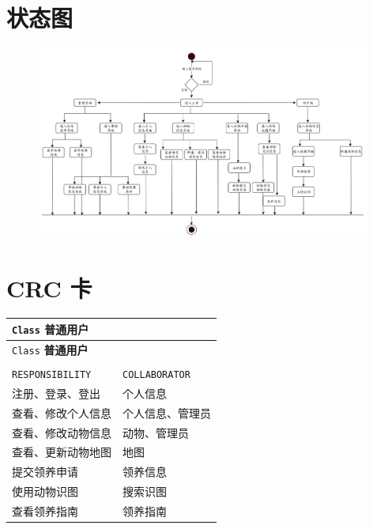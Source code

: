 \documentclass[12pt,a4paper,UTF8]{article}
\begin{document}
\section{状态图}

\begin{figure}[H]
  \centering
  \includegraphics[width=0.98\textwidth]{figures/state.png}
\end{figure}

\section{CRC 卡}

\begin{xltabular}{\linewidth}{|>{\raggedright\arraybackslash}p{8cm}|>{\raggedright\arraybackslash}p{4cm}|}
  \hline
  \verb|Class| \textbf{普通用户} &  \\ \hline \endfirsthead
  \hline
  \verb|Class| \textbf{普通用户} &  \\ \hline \endhead
  \hline
   \\ \endfoot
  \hline \endlastfoot

  \verb|RESPONSIBILITY| & \verb|COLLABORATOR| \\ \hline
  注册、登录、登出 & 个人信息 \\ \hline
  查看、修改个人信息 & 个人信息、管理员 \\ \hline
  查看、修改动物信息 & 动物、管理员 \\ \hline
  查看、更新动物地图 & 地图 \\ \hline
  提交领养申请 & 领养信息 \\ \hline
  使用动物识图 & 搜索识图 \\ \hline 
  查看领养指南 & 领养指南 \\ \hline
\end{xltabular}
\end{document}
